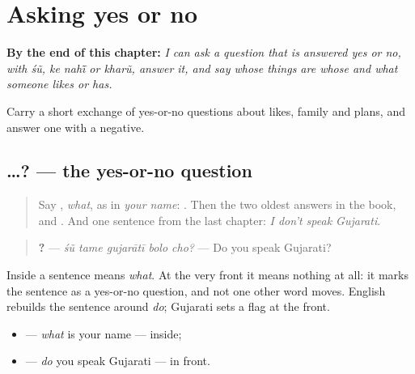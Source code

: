 
\chapter{Asking yes or no}
\label{ch:gu-asking-yes-or-no}

\begin{chapteropening}
\textbf{By the end of this chapter:} \emph{I can ask a question that is answered yes or no, with śũ, ke nahī̃ or kharũ, answer it, and say whose things are whose and what someone likes or has.}

Carry a short exchange of yes-or-no questions about likes, family and plans, and answer one with a negative.
\end{chapteropening}

\section[\texorpdfstring{\gu{શું} …? (śũ …?)}{શું …? (śũ …?)}]{ …? — the yes-or-no question}

\label{lesson:GU-C146-shun-polar}



\begin{quote}
Say \textbf{}, \emph{what}, as in \emph{your name}: \textbf{   }. Then the two oldest answers in the book, \textbf{} and \textbf{}. And one sentence from the last chapter: \emph{I don't speak Gujarati}.
\end{quote}

\begin{grammarlens}[title={Grammar Lens: \gu{શું} at the front}]
\begin{quote}
\textbf{    ?} — \emph{śũ tame gujarātī bolo cho?} — Do you speak Gujarati?
\end{quote}

Inside a sentence \textbf{} means \emph{what}. At the very front it means nothing at all: it marks the sentence as a yes-or-no question, and not one other word moves. English rebuilds the sentence around \emph{do}; Gujarati sets a flag at the front.

\begin{itemize}
\raggedright
  \item \textbf{   } — \emph{what} is your name — inside;
  \item \textbf{    } — \emph{do} you speak Gujarati — in front.
\end{itemize}
\end{grammarlens}

